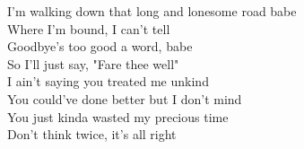 I'm walking down that long and lonesome road babe \\ 
Where I'm bound, I can't tell \\ 
Goodbye's too good a word, babe \\ 
So I'll just say, "Fare thee well" \\ 
I ain't saying you treated me unkind \\ 
You could've done better but I don't mind \\ 
You just kinda wasted my precious time \\ 
Don't think twice, it's all right \\ 
